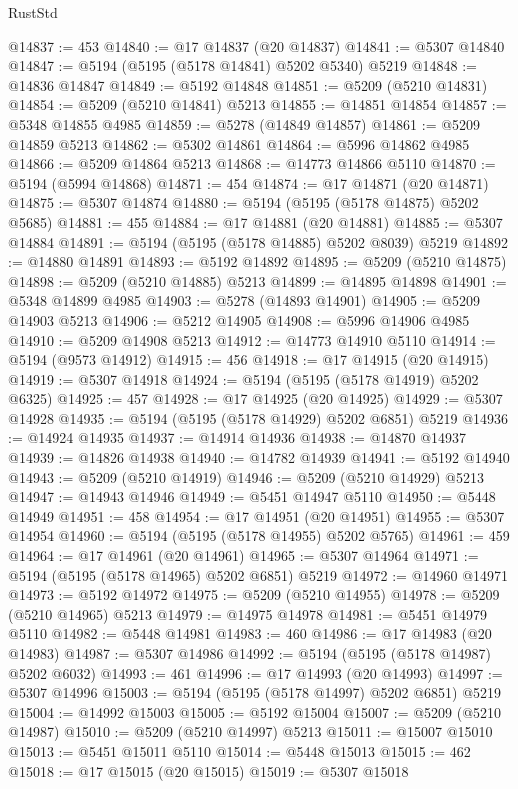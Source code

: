 \begin{lexlean}{RustStd}
\begin{coremodule}
@14837 := 453
@14840 := @17 @14837 (@20 @14837)
@14841 := @5307 @14840
@14847 := @5194 (@5195 (@5178 @14841) @5202 @5340) @5219
@14848 := @14836 @14847
@14849 := @5192 @14848
@14851 := @5209 (@5210 @14831)
@14854 := @5209 (@5210 @14841) @5213
@14855 := @14851 @14854
@14857 := @5348 @14855 @4985
@14859 := @5278 (@14849 @14857)
@14861 := @5209 @14859 @5213
@14862 := @5302 @14861
@14864 := @5996 @14862 @4985
@14866 := @5209 @14864 @5213
@14868 := @14773 @14866 @5110
@14870 := @5194 (@5994 @14868)
@14871 := 454
@14874 := @17 @14871 (@20 @14871)
@14875 := @5307 @14874
@14880 := @5194 (@5195 (@5178 @14875) @5202 @5685)
@14881 := 455
@14884 := @17 @14881 (@20 @14881)
@14885 := @5307 @14884
@14891 := @5194 (@5195 (@5178 @14885) @5202 @8039) @5219
@14892 := @14880 @14891
@14893 := @5192 @14892
@14895 := @5209 (@5210 @14875)
@14898 := @5209 (@5210 @14885) @5213
@14899 := @14895 @14898
@14901 := @5348 @14899 @4985
@14903 := @5278 (@14893 @14901)
@14905 := @5209 @14903 @5213
@14906 := @5212 @14905
@14908 := @5996 @14906 @4985
@14910 := @5209 @14908 @5213
@14912 := @14773 @14910 @5110
@14914 := @5194 (@9573 @14912)
@14915 := 456
@14918 := @17 @14915 (@20 @14915)
@14919 := @5307 @14918
@14924 := @5194 (@5195 (@5178 @14919) @5202 @6325)
@14925 := 457
@14928 := @17 @14925 (@20 @14925)
@14929 := @5307 @14928
@14935 := @5194 (@5195 (@5178 @14929) @5202 @6851) @5219
@14936 := @14924 @14935
@14937 := @14914 @14936
@14938 := @14870 @14937
@14939 := @14826 @14938
@14940 := @14782 @14939
@14941 := @5192 @14940
@14943 := @5209 (@5210 @14919)
@14946 := @5209 (@5210 @14929) @5213
@14947 := @14943 @14946
@14949 := @5451 @14947 @5110
@14950 := @5448 @14949
@14951 := 458
@14954 := @17 @14951 (@20 @14951)
@14955 := @5307 @14954
@14960 := @5194 (@5195 (@5178 @14955) @5202 @5765)
@14961 := 459
@14964 := @17 @14961 (@20 @14961)
@14965 := @5307 @14964
@14971 := @5194 (@5195 (@5178 @14965) @5202 @6851) @5219
@14972 := @14960 @14971
@14973 := @5192 @14972
@14975 := @5209 (@5210 @14955)
@14978 := @5209 (@5210 @14965) @5213
@14979 := @14975 @14978
@14981 := @5451 @14979 @5110
@14982 := @5448 @14981
@14983 := 460
@14986 := @17 @14983 (@20 @14983)
@14987 := @5307 @14986
@14992 := @5194 (@5195 (@5178 @14987) @5202 @6032)
@14993 := 461
@14996 := @17 @14993 (@20 @14993)
@14997 := @5307 @14996
@15003 := @5194 (@5195 (@5178 @14997) @5202 @6851) @5219
@15004 := @14992 @15003
@15005 := @5192 @15004
@15007 := @5209 (@5210 @14987)
@15010 := @5209 (@5210 @14997) @5213
@15011 := @15007 @15010
@15013 := @5451 @15011 @5110
@15014 := @5448 @15013
@15015 := 462
@15018 := @17 @15015 (@20 @15015)
@15019 := @5307 @15018

\end{coremodule}
\end{lexlean}
